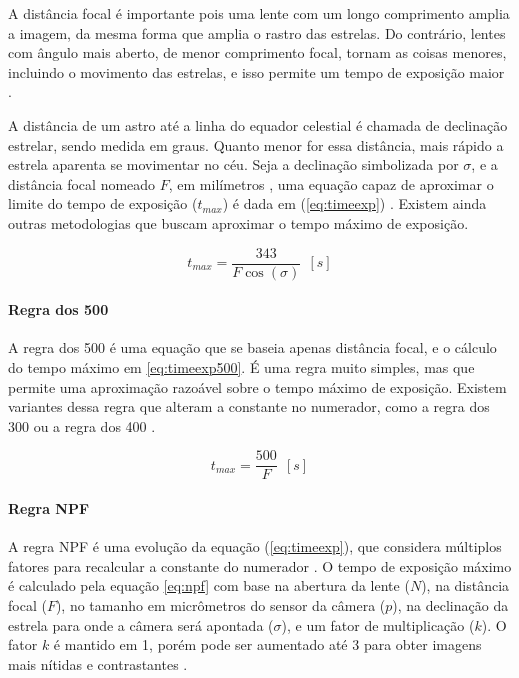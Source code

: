 A distância focal é importante pois uma lente com um longo comprimento amplia a imagem, da mesma forma que amplia o rastro das estrelas. Do contrário, lentes com ângulo mais aberto, de menor comprimento focal, tornam as coisas menores, incluindo o movimento das estrelas, e isso permite um tempo de exposição maior \cite{book:astrophotographyAmateur}.

A distância de um astro até a linha do equador celestial é chamada de declinação estrelar, sendo medida em graus. Quanto menor for essa distância, mais rápido a estrela aparenta se movimentar no céu. Seja a declinação simbolizada por $\sigma$, e a distância focal nomeado $F$, em milímetros , uma equação capaz de aproximar o limite do tempo de exposição ($ t_{max} $) é dada em (\ref{eq:timeexp}) \cite{book:astrophotographyAmateur}. Existem ainda outras metodologias que buscam aproximar o tempo máximo de exposição. 

\begin{equation}
	t_{max} = \dfrac{343}{F\cos(\sigma)}~~[s]
	\label{eq:timeexp}
\end{equation}



\paragraph{Regra dos 500}

A regra dos 500 é uma equação que se baseia apenas distância focal, e o cálculo do tempo máximo em \ref{eq:timeexp500}. É uma regra muito simples, mas que permite uma aproximação razoável sobre o tempo máximo de exposição. Existem variantes dessa regra que alteram a constante no numerador, como a regra dos 300 ou a regra dos 400 \cite{site:500xNPF}.

\begin{equation}
	t_{max} = \dfrac{500}{F}~~[s]
	\label{eq:timeexp500}
\end{equation}

\paragraph{Regra NPF}

A regra NPF é uma evolução da equação (\ref{eq:timeexp}), que considera múltiplos fatores para recalcular a constante do numerador
\cite{site:500xNPF}. O tempo de exposição máximo é calculado pela equação \ref{eq:npf} com base na abertura da lente ($ N $), na distância focal ($ F $), no tamanho em micrômetros do sensor da câmera ($ p $), na declinação da estrela para onde a câmera será apontada ($\sigma$), e um fator de multiplicação ($ k $). O fator $ k $ é mantido em 1, porém pode ser aumentado até 3 para obter imagens mais nítidas e contrastantes \cite{site:500xNPF}. 

